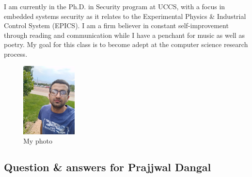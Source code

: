 I am currently in the Ph.D. in Security program at UCCS, with a focus in embedded systems security as it relates to the Experimental Physics \& Industrial Control System (EPICS). I am a firm believer in constant self-improvement through reading and communication while I have a penchant for music as well as poetry. My goal for this class is to become adept at the computer science research process.


\begin{figure} [h]
    \captionsetup{justification=centering}
    \centering
    \includegraphics [width= 0.25\textwidth] {Dangal-UCCS}
    \caption{My photo}
    \label{fig:my_label}
\end{figure}

%

\subsection{Question \& answers for Prajjwal Dangal}







    
    
